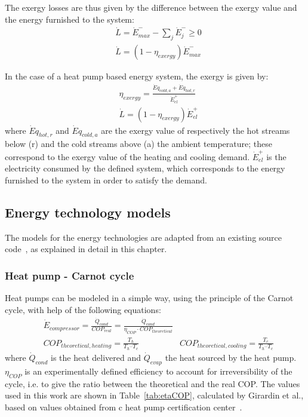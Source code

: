 \documentclass{article}
\begin{document}
The exergy losses are thus given by the difference between the exergy value and the energy furnished to the system:
\begin{align}
	&    \dot{L} = \dot{E}^{-}_{max} - \sum_{j}\dot{E}^{-}_{j} \geq 0 \\
	& 	\dot{L} = (1-\eta_{exergy})\dot{E}^{-}_{max}
\end{align}

In the case of a heat pump based energy system, the exergy is given by:
\begin{align}
    & \eta_{exergy} =  \frac{\dot{E}q_{cold,a} + \dot{E}q_{hot,r}}{\dot{E}_{el}^{+}}  \\
    & \dot{L} = (1-\eta_{exergy})\dot{E}_{el}^{+}
\end{align}
where $\dot{E}q_{hot,r}$  and $\dot{E}q_{cold,a}$ are the exergy value of respectively the hot streams below (r) and the cold streams above (a) the ambient temperature; these correspond to the exergy value of the heating and cooling demand. $\dot{E}_{el}^{+}$ is the electricity consumed by the defined system, which corresponds to the energy furnished to the system in order to satisfy the demand.

\subsection{Energy technology models}\label{ss:et}
The models for the energy technologies are adapted from an existing source code~\cite{suciuEnergyautonomousCitiesUsing2016}, as explained in detail in this chapter.

\subsubsection{Heat pump - Carnot cycle}\label{sss:hp_carnot}
Heat pumps can be modeled in a simple way, using the principle of the Carnot cycle, with help of the following equations:
\begin{align}
    & \dot{E}_{compressor} = \frac{\dot{Q}_{cond}}{COP_{real}} = \frac{\dot{Q}_{cond}}{\eta_{COP} \cdot COP_{theoretical}} \\
    & COP_{theoretical, heating} =  \frac{T_{h}}{T_{h} – T_{c}}  
    & COP_{theoretical, cooling} =  \frac{T_{c}}{T_{h} – T_{c}} 
\end{align}
where $\dot{Q}_{cond}$ is the heat delivered and $\dot{Q}_{evap}$ the heat sourced by the heat pump. $\eta_{COP}$ is an experimentally defined efficiency to account for irreversibility of the cycle, i.e. to give the ratio between the theoretical and the real COP. The values used in this work are shown in Table~\ref{tab:etaCOP}, calculated by Girardin et al.\cite{girardinEnerGisGeographicalInformation2010}, based on values obtained from c heat pump certification center~\cite{NTBBuchsInstitut}. \\
\end{document}
